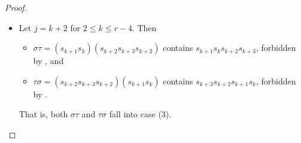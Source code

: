 \documentclass[10pt,a4paper]{amsart}
\begin{document}
\begin{proof}
\begin{itemize}
\begin{itemize}
        \end{itemize}
        That is, both $\sigma\tau$ and $\tau\sigma$ fall into case (3).
        \item Let $j=k+2$ for $2\leq k\leq r-4$. Then \begin{itemize}
            \item $\sigma\tau=(s_{k+1}s_k)(s_{k+2}s_{k+3}s_{k+2})$ contains $s_{k+1}s_ks_{k+2}s_{k+3}$, forbidden by , and
            \item $\tau\sigma=(s_{k+2}s_{k+3}s_{k+2})(s_{k+1}s_k)$ contains $s_{k+3}s_{k+2}s_{k+1}s_k$, forbidden by .
        \end{itemize}
        That is, both $\sigma\tau$ and $\tau\sigma$ fall into case (3).
    \end{itemize}


\end{proof}
\end{document}
